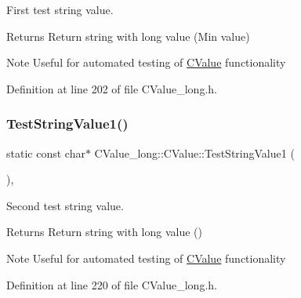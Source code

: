 First test string value. 

\begin{DoxyReturn}{Returns}
Return string with {\ttfamily long} value ({\ttfamily Min} value) 
\end{DoxyReturn}
\begin{DoxyNote}{Note}
Useful for automated testing of \hyperlink{class_c_value__long_1_1_c_value}{C\+Value} functionality 
\end{DoxyNote}


Definition at line 202 of file C\+Value\+\_\+long.\+h.

\mbox{\label{class_c_value__long_1_1_c_value_a785ec883ee1bb84e4c84b25185663b17}} 
\subsubsection{\texorpdfstring{Test\+String\+Value1()}{TestStringValue1()}}
{\footnotesize\ttfamily static const char$\ast$ C\+Value\+\_\+long\+::\+C\+Value\+::\+Test\+String\+Value1 (\begin{DoxyParamCaption}{ }\end{DoxyParamCaption})\hspace{0.3cm}{\ttfamily [inline]}, {\ttfamily [static]}}



Second test string value. 

\begin{DoxyReturn}{Returns}
Return string with {\ttfamily long} value ({}) 
\end{DoxyReturn}
\begin{DoxyNote}{Note}
Useful for automated testing of \hyperlink{class_c_value__long_1_1_c_value}{C\+Value} functionality 
\end{DoxyNote}


Definition at line 220 of file C\+Value\+\_\+long.\+h.

\mbox{\label{class_c_value__long_1_1_c_value_a4be48c0d2c618a6497510c0d7d8dc360}} 
